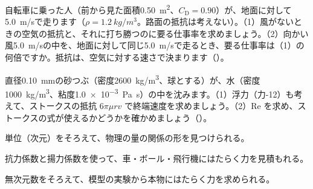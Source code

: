 \bkproblem 自転車に乗った人（前から見た面積\qty{0.50}{m^2}、$C_{\mathrm D}=0.90$）が、地面に対して\qty{5.0}{m/s}で走ります（$\rho=\qty{1.2}{kg/m^3}$。路面の抵抗は考えない）。（1）風がないときの空気の抵抗と、それに打ち勝つのに要る仕事率を求めましょう。（2）向かい風\qty{5.0}{m/s}の中を、地面に対して同じ\qty{5.0}{m/s}で走るとき、要る仕事率は（1）の何倍ですか。抵抗は、空気に対する速さで決まります（）。

\newpage%
\bkproblem 直径\qty{0.10}{mm}の砂つぶ（密度\qty{2600}{kg/m^3}、球とする）が、水（密度\qty{1000}{kg/m^3}、粘度\qty{1.0e-3}{Pa.s}）の中を沈みます。（1）浮力（力-12）も考えて、ストークスの抵抗 $6\pi\mu rv$ で終端速度を求めましょう。（2）Re を求め、ストークスの式が使えるかどうかを確かめましょう（）。

\begin{furikaeri}
\begin{checklist}
\item 単位（次元）をそろえて、物理の量の関係の形を見つけられる。
\item 抗力係数と揚力係数を使って、車・ボール・飛行機にはたらく力を見積もれる。
\item 無次元数をそろえて、模型の実験から本物にはたらく力を求められる。
\end{checklist}
\end{furikaeri}

